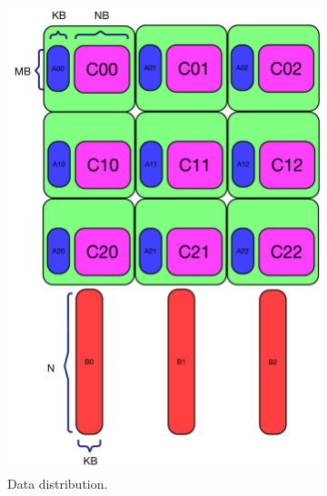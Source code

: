 
\begin{figure}[b!]
  \centering
  \begin{subfigure}{0.40\columnwidth}
    \includegraphics[width=\linewidth]{figures/gemm_A_C_memory_master/1.pdf}
    \caption{Data distribution.}
    \label{fig:gemm_master_1}
  \end{subfigure}
  \begin{subfigure}{0.40\columnwidth}

\end{subfigure}
\end{figure}
